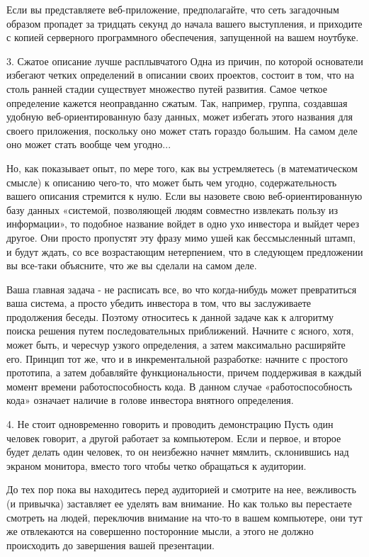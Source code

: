 \documentclass[ebook,12pt,oneside,openany]{memoir}
\begin{document}
Если вы представляете веб-приложение, предполагайте, что сеть
загадочным образом пропадет за тридцать секунд до начала вашего
выступления, и приходите с копией серверного программного обеспечения,
запущенной на вашем ноутбуке.

3. Сжатое описание лучше расплывчатого Одна из причин, по которой
основатели избегают четких определений в описании своих проектов,
состоит в том, что на столь ранней стадии существует множество путей
развития. Самое четкое определение кажется неоправданно сжатым. Так,
например, группа, создавшая удобную веб-ориентированную базу данных,
может избегать этого названия для своего приложения, поскольку оно
может стать гораздо большим. На самом деле оно может стать вообще чем
угодно...

Но, как показывает опыт, по мере того, как вы устремляетесь (в
математическом смысле) к описанию чего-то, что может быть чем угодно,
содержательность вашего описания стремится к нулю. Если вы назовете
свою веб-ориентированную базу данных «системой, позволяющей людям
совместно извлекать пользу из информации», то подобное название войдет
в одно ухо инвестора и выйдет через другое. Они просто пропустят эту
фразу мимо ушей как бессмысленный штамп, и будут ждать, со все
возрастающим нетерпением, что в следующем предложении вы все-таки
объясните, что же вы сделали на самом деле.

Ваша главная задача - не расписать все, во что когда-нибудь может
превратиться ваша система, а просто убедить инвестора в том, что вы
заслуживаете продолжения беседы. Поэтому относитесь к данной задаче
как к алгоритму поиска решения путем последовательных приближений.
Начните с ясного, хотя, может быть, и чересчур узкого определения, а
затем максимально расширяйте его. Принцип тот же, что и в
инкрементальной разработке: начните с простого прототипа, а затем
добавляйте функциональности, причем поддерживая в каждый момент
времени работоспособность кода. В данном случае «работоспособность
кода» означает наличие в голове инвестора внятного определения.

4. Не стоит одновременно говорить и проводить демонстрацию Пусть один
человек говорит, а другой работает за компьютером. Если и первое, и
второе будет делать один человек, то он неизбежно начнет мямлить,
склонившись над экраном монитора, вместо того чтобы четко обращаться к
аудитории.

До тех пор пока вы находитесь перед аудиторией и смотрите на нее,
вежливость (и привычка) заставляет ее уделять вам внимание. Но как
только вы перестаете смотреть на людей, переключив внимание на что-то
в вашем компьютере, они тут же отвлекаются на совершенно посторонние
мысли, а этого не должно происходить до завершения вашей презентации.
\end{document}
